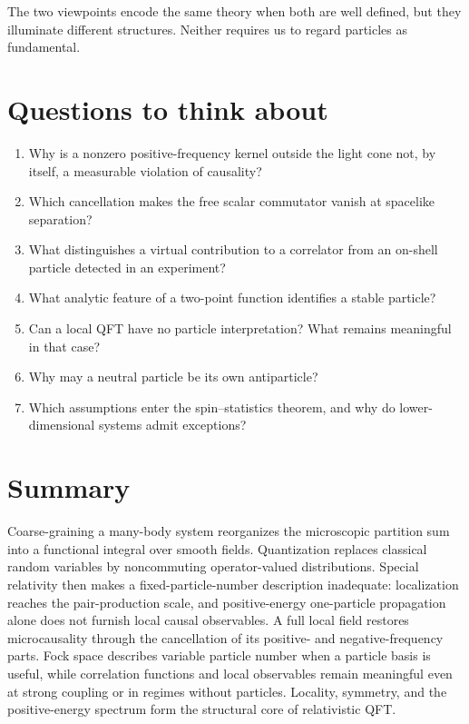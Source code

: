 \documentclass[11pt]{article}
\begin{document}
The two viewpoints encode the same theory when both are well defined, but
they illuminate different structures.  Neither requires us to regard
particles as fundamental.

\section{Questions to think about}

\begin{enumerate}
  \item Why is a nonzero positive-frequency kernel outside the light cone
  not, by itself, a measurable violation of causality?
  \item Which cancellation makes the free scalar commutator vanish at
  spacelike separation?
  \item What distinguishes a virtual contribution to a correlator from an
  on-shell particle detected in an experiment?
  \item What analytic feature of a two-point function identifies a stable
  particle?
  \item Can a local QFT have no particle interpretation?  What remains
  meaningful in that case?
  \item Why may a neutral particle be its own antiparticle?
  \item Which assumptions enter the spin--statistics theorem, and why do
  lower-dimensional systems admit exceptions?
\end{enumerate}

\section*{Summary}

Coarse-graining a many-body system reorganizes the microscopic partition sum
into a functional integral over smooth fields.  Quantization replaces
classical random variables by noncommuting operator-valued distributions.
Special relativity then makes a fixed-particle-number description
inadequate: localization reaches the pair-production scale, and
positive-energy one-particle propagation alone does not furnish local causal
observables.  A full local field restores microcausality through the
cancellation of its positive- and negative-frequency parts.  Fock space
describes variable particle number when a particle basis is useful, while
correlation functions and local observables remain meaningful even at strong
coupling or in regimes without particles.  Locality, symmetry, and the
positive-energy spectrum form the structural core of relativistic QFT.
\end{document}
